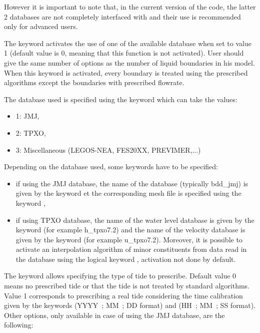 However it is important to note that, in the current version of the code, the latter 2 databases are not completely interfaced with  and their use is recommended only for advanced users.

 The keyword  activates the use of one of the available database when set to value 1 (default value is 0, meaning that this function is not activated). User should give the same number of options as the number of liquid boundaries in his model. When this keyword is activated, every boundary is treated using the prescribed algorithms except the boundaries with prescribed flowrate.

 The database used is specified using the keyword which can take the values:

\begin{itemize}
\item [\nonumber] 1: JMJ,

\item [\nonumber] 2: TPXO,

\item [\nonumber] 3: Miscellaneous (LEGOS-NEA, FES20XX, PREVIMER,...)
\end{itemize}

  Depending on the database used, some keywords have to be specified:

\begin{itemize}
\item  if using the JMJ database, the name of the database (typically bdd\_jmj) is given by the keyword  et the corresponding mesh file is specified using the keyword ,

\item  if using TPXO database, the name of the water level database is given by the keyword  (for example h\_tpxo7.2) and the name of the velocity database is given by the keyword  (for example u\_tpxo7.2). Moreover, it is possible to activate an interpolation algorithm of minor constituents from data read in the database using the logical keyword , activation not done by default.
\end{itemize}

 The keyword allows specifying the type of tide to prescribe. Default value 0 means no prescribed tide or that the tide is not treated by standard algorithms. Value 1 corresponds to prescribing a real tide considering the time calibration given by the keywords  (YYYY~; MM~; DD format) and  (HH~; MM~; SS format). Other options, only available in case of using the JMJ database, are the following:

